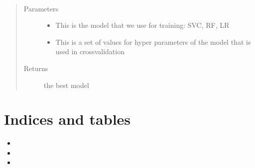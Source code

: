 \documentclass[letterpaper,10pt,english]{sphinxmanual}
\begin{document}
\begin{fulllineitems}
\begin{fulllineitems}
\label{\detokenize{lhat:lhat.Model.MachineLearning.trainModel}}~\begin{quote}\begin{description}
\item[{Parameters}] \leavevmode\begin{itemize}
\item {} 
 \textendash{} This is the model that we use for training: SVC, RF, LR

\item {} 
 \textendash{} This is a set of values for hyper parameters of the model that is used in cross\sphinxhyphen{}validation

\end{itemize}

\item[{Returns}] \leavevmode
the best model

\end{description}\end{quote}

\end{fulllineitems}


\begin{fulllineitems}
\label{\detokenize{lhat:lhat.Model.MachineLearning.trainTestSplit}}
\end{fulllineitems}


\end{fulllineitems}



\chapter{Indices and tables}
\label{\detokenize{index:indices-and-tables}}\begin{itemize}
\item {} 

\item {} 

\item {} 

\end{itemize}
\end{document}

